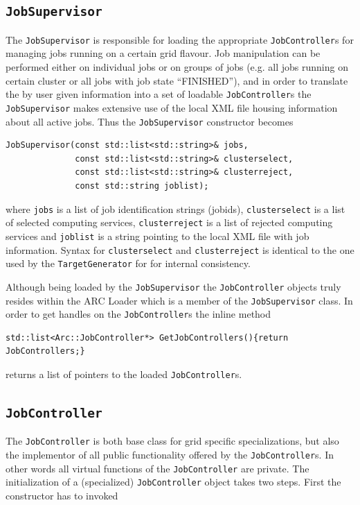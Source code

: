 \documentclass{book}
\newcommand{\TargetGenerator}{\texttt{TargetGenerator}}
\newcommand{\JobSupervisor}{\texttt{JobSupervisor}}
\newcommand{\JobController}{\texttt{JobController}}
\begin{document}
\subsection{{\JobSupervisor}} The {\JobSupervisor} is responsible for loading the appropriate {\JobController}s for managing 
jobs running on a certain grid flavour. Job manipulation can be performed either on individual jobs or on groups of jobs (e.g. 
all jobs running on certain cluster or all jobs with job state ``FINISHED''), and in order to translate the by user given 
information into a set of loadable {\JobController}s the {\JobSupervisor} makes extensive use of the local XML file housing 
information about all active jobs. Thus the {\JobSupervisor} constructor becomes

\begin{shaded}
\begin{verbatim}
JobSupervisor(const std::list<std::string>& jobs,
              const std::list<std::string>& clusterselect,
              const std::list<std::string>& clusterreject,
              const std::string joblist);
\end{verbatim}
\end{shaded}

where \texttt{jobs} is a list of job identification strings (jobids), \texttt{clusterselect} is a list of selected computing services, 
\texttt{clusterreject} is a list of rejected computing services and \texttt{joblist} is a string pointing to the local XML file 
with job information. Syntax for \texttt{clusterselect} and \texttt{clusterreject} is identical to the one used by the {\TargetGenerator}
for for internal consistency.

Although being loaded by the {\JobSupervisor} the {\JobController} objects truly resides within the ARC Loader which is a member 
of the {\JobSupervisor} class. In order to get handles on the {\JobController}s the inline method

\begin{shaded}
\begin{verbatim}
std::list<Arc::JobController*> GetJobControllers(){return JobControllers;}
\end{verbatim}
\end{shaded}

returns a list of pointers to the loaded {\JobController}s.

\subsection{{\JobController}} The {\JobController} is both base class for grid specific specializations, but also the implementor of all 
public functionality offered by the {\JobController}s. In other words all virtual functions of the {\JobController} are private. The 
initialization of a (specialized) {\JobController} object takes two steps. First the constructor has to invoked
\end{document}
